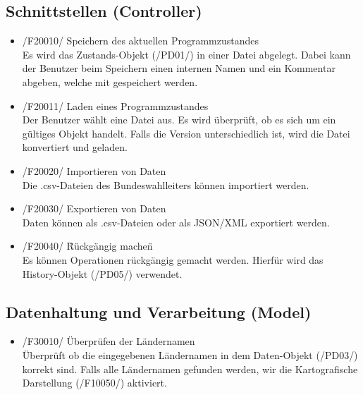\documentclass[10pt,a4paper]{article}
\begin{document}
\subsection{Schnittstellen (Controller)}
\begin{itemize}
	\item /F20010/ Speichern des aktuellen Programmzustandes \hfill \\
	Es wird das Zustands-Objekt (/PD01/) in einer Datei abgelegt. Dabei kann der Benutzer beim Speichern einen internen Namen und ein Kommentar abgeben, welche mit gespeichert werden.
	\item /F20011/ Laden eines Programmzustandes \hfill \\
	Der Benutzer wählt eine Datei aus. Es wird überprüft, ob es sich um ein gültiges Objekt handelt. Falls die Version unterschiedlich ist, wird die Datei konvertiert und geladen.
	\item /F20020/ Importieren von Daten \hfill \\
	Die .csv-Dateien des Bundeswahlleiters können importiert werden.
	\item /F20030/ Exportieren von Daten \hfill \\
	Daten können als .csv-Dateien oder als JSON/XML exportiert werden.
	\item /F20040/ \"Rückgängig machen\" \hfill \\
	Es können Operationen rückgängig gemacht werden. Hierfür wird das History-Objekt (/PD05/) verwendet.
\end{itemize}

\subsection{Datenhaltung und Verarbeitung (Model)}
\begin{itemize}
	\item /F30010/ Überprüfen der Ländernamen \hfill \\
	Überprüft ob die eingegebenen Ländernamen in dem Daten-Objekt (/PD03/) korrekt sind. Falls alle Ländernamen gefunden werden, wir die Kartografische Darstellung (/F10050/) aktiviert.
\end{itemize}
\end{document}
